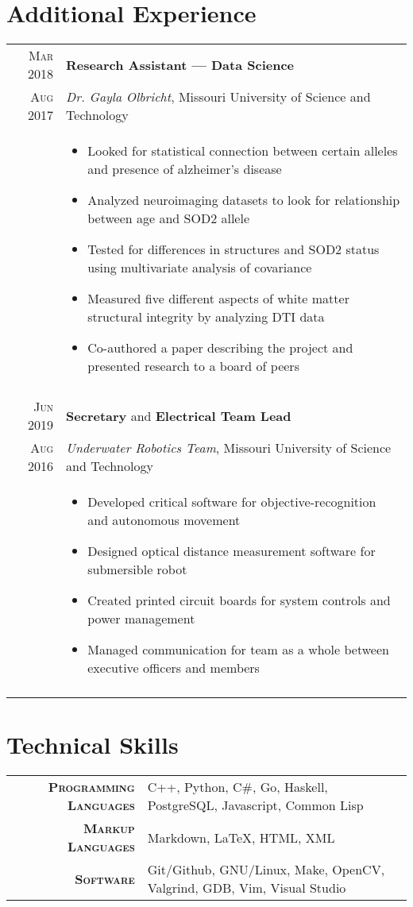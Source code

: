 \documentclass[a4paper,10pt]{article}
\newcommand{\br}{\\\multicolumn{2}{c}{}}
\begin{document}
\section{Additional Experience}
\begin{tabular}{r|p{15cm}}
    \textsc{Mar 2018} & \textbf{Research Assistant --- Data Science} \\
    \textsc{Aug 2017} & \textit{Dr. Gayla Olbricht}, Missouri University of Science and Technology \\ &
    \begin{itemize}
    \item Looked for statistical connection between certain alleles and presence of alzheimer's disease
    \item Analyzed neuroimaging datasets to look for relationship between age and SOD2 allele
    \item Tested for differences in structures and SOD2 status using multivariate analysis of covariance
    \item Measured five different aspects of white matter structural integrity by analyzing DTI data
    \item Co-authored a paper describing the project and presented research to a board of peers
    \end{itemize} \br\\

    \textsc{Jun 2019} & \textbf{Secretary} and \textbf{Electrical Team Lead} \\
    \textsc{Aug 2016} & \textit{Underwater Robotics Team}, Missouri University of Science and Technology \\ &
    \begin{itemize}
    \item Developed critical software for objective-recognition and autonomous movement
    \item Designed optical distance measurement software for submersible robot
    \item Created printed circuit boards for system controls and power management
    \item Managed communication for team as a whole between executive officers and members
    \end{itemize} \br\\

\end{tabular}

\section{Technical Skills}
\begin{tabular}{r|p{15cm}}
    \textsc{\small \textbf {Programming Languages}} &
    C++,
    Python,
    C\#,
    Go,
    Haskell,
    PostgreSQL,
    Javascript,
    Common Lisp\\

    \textsc{\small \textbf {Markup Languages}} &
    Markdown,
    \LaTeX,
    HTML,
    XML\\

    \textsc{\small \textbf {Software}} &
    Git/Github,
    GNU/Linux,
    Make,
    OpenCV,
    Valgrind,
    GDB,
    Vim,
    Visual Studio
\end{tabular}
\end{document}
